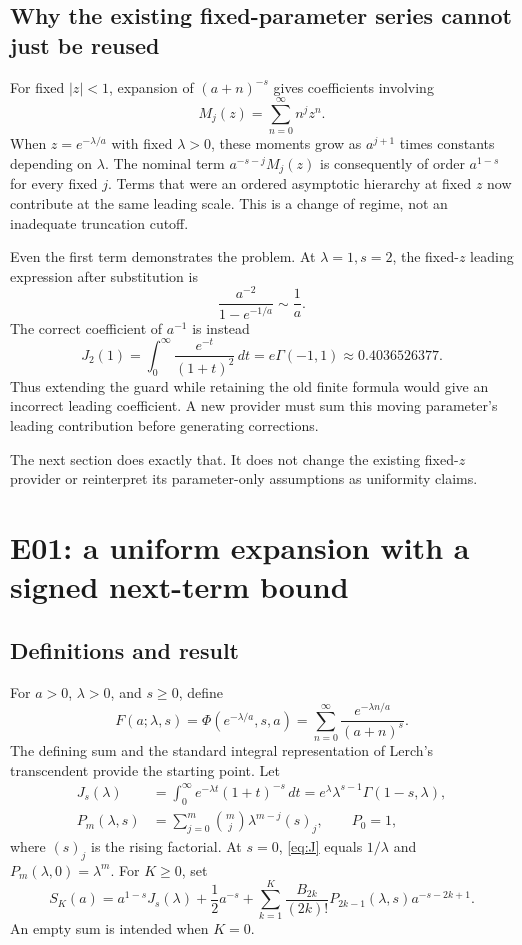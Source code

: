 \documentclass[11pt,a4paper]{article}
\newcommand{\PhiL}{\Phi}
\begin{document}
\subsection{Why the existing fixed-parameter series cannot just be reused}

For fixed $|z|<1$, expansion of $(a+n)^{-s}$ gives coefficients involving
\[
 M_j(z)=\sum_{n=0}^{\infty}n^jz^n.
\]
When $z=e^{-\lambda/a}$ with fixed $\lambda>0$, these moments grow as
$a^{j+1}$ times constants depending on $\lambda$. The nominal term
$a^{-s-j}M_j(z)$ is consequently of order $a^{1-s}$ for every fixed $j$.
Terms that were an ordered asymptotic hierarchy at fixed $z$ now contribute
at the same leading scale. This is a change of regime, not an inadequate
truncation cutoff.

Even the first term demonstrates the problem. At $\lambda=1,s=2$, the
fixed-$z$ leading expression after substitution is
\[
 \frac{a^{-2}}{1-e^{-1/a}}\sim\frac1a.
\]
The correct coefficient of $a^{-1}$ is instead
\[
 J_2(1)=\int_0^\infty\frac{e^{-t}}{(1+t)^2}\,dt
       =e\Gamma(-1,1)\approx0.4036526377.
\]
Thus extending the guard while retaining the old finite formula would give
an incorrect leading coefficient. A new provider must sum this moving
parameter's leading contribution before generating corrections.

The next section does exactly that. It does not change the existing fixed-$z$
provider or reinterpret its parameter-only assumptions as uniformity claims.

\section{E01: a uniform expansion with a signed next-term bound}
\label{sec:uniform}

\subsection{Definitions and result}

For $a>0$, $\lambda>0$, and $s\geq0$, define
\[
 F(a;\lambda,s)=\PhiL(e^{-\lambda/a},s,a)
 =\sum_{n=0}^{\infty}\frac{e^{-\lambda n/a}}{(a+n)^s}.
\]
The defining sum and the standard integral representation of Lerch's
transcendent provide the starting point.\cite{lerch}
Let
\begin{align}
 J_s(\lambda)&=\int_0^\infty e^{-\lambda t}(1+t)^{-s}\,dt
 =e^\lambda\lambda^{s-1}\Gamma(1-s,\lambda),\label{eq:J}\\
 P_m(\lambda,s)&=\sum_{j=0}^m\binom mj\lambda^{m-j}(s)_j,
 \qquad P_0=1,\label{eq:P}
\end{align}
where $(s)_j$ is the rising factorial. At $s=0$, \eqref{eq:J} equals
$1/\lambda$ and $P_m(\lambda,0)=\lambda^m$.
For $K\geq0$, set
\begin{equation}
 S_K(a)=a^{1-s}J_s(\lambda)+\frac12a^{-s}
 +\sum_{k=1}^K\frac{B_{2k}}{(2k)!}
       P_{2k-1}(\lambda,s)a^{-s-2k+1}.
 \label{eq:SK}
\end{equation}
An empty sum is intended when $K=0$.
\end{document}
